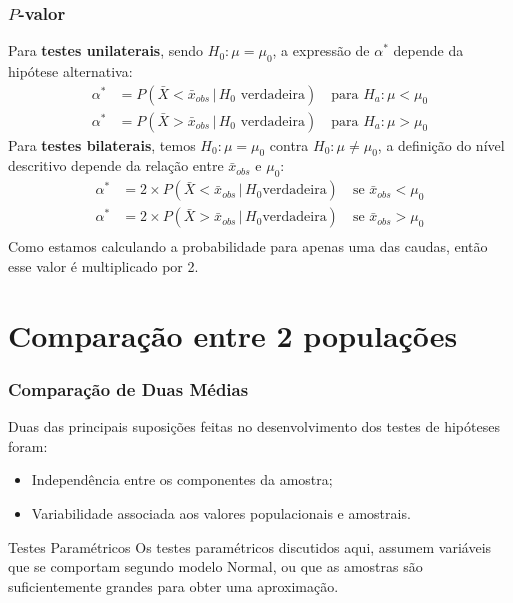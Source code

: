 \documentclass{beamer}
\begin{document}
\begin{frame}
\frametitle{\(P\)-valor}

Para \textbf{testes unilaterais}, sendo \(H_0: \mu = \mu_0\), a
expressão de \(\alpha^*\) depende da hipótese alternativa:
\begin{align*}
\alpha^* &= P(\bar{X} < \bar{x}_{obs} \, | \, H_0 \text{ verdadeira}) \quad
\text{para } H_a: \mu < \mu_0 \\
\alpha^* &= P(\bar{X} > \bar{x}_{obs} \, | \, H_0 \text{ verdadeira}) \quad
\text{para } H_a: \mu > \mu_0
\end{align*} Para \textbf{testes bilaterais}, temos \(H_0: \mu = \mu_0\)
contra \(H_0: \mu \neq \mu_0\), a definição do nível descritivo depende
da relação entre \(\bar{x}_{obs}\) e \(\mu_0\): \begin{align*}
\alpha^* &= 2 \times P(\bar{X} < \bar{x}_{obs} \, | \, H_0 \text{
verdadeira}) \quad \text{se }  \bar{x}_{obs} < \mu_0 \\
\alpha^* &= 2 \times P(\bar{X} > \bar{x}_{obs} \, | \, H_0 \text{
verdadeira}) \quad \text{se }  \bar{x}_{obs} > \mu_0 \\
\end{align*} Como estamos calculando a probabilidade para apenas uma das
caudas, então esse valor é multiplicado por 2.
\end{frame}


\section{Comparação entre 2 populações}
\begin{frame}
\frametitle{Comparação de Duas Médias}

Duas das principais suposições feitas no desenvolvimento dos testes de hipóteses foram:

\begin{itemize}
\item
  Independência entre os componentes da amostra;
\item
  Variabilidade associada aos valores populacionais e amostrais.
\end{itemize}

\begin{block}{Testes Paramétricos}
Os testes paramétricos discutidos aqui, assumem variáveis que se comportam segundo modelo Normal, ou que as amostras são suficientemente grandes para obter uma aproximação.
\end{block}
\end{frame}
\end{document}
